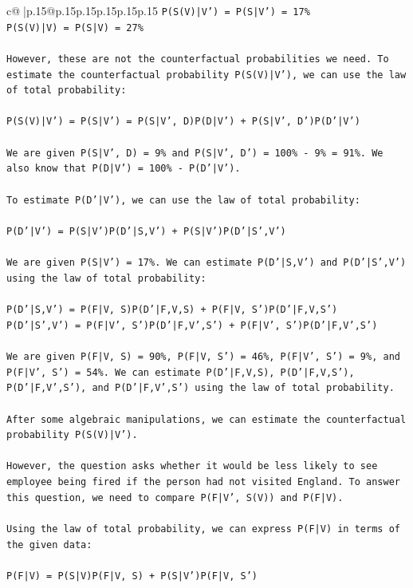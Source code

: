 \documentclass{article}
\begin{document}
{\begin{supertabular}{c@{$\;$}|p{.15\linewidth}@{}p{.15\linewidth}p{.15\linewidth}p{.15\linewidth}p{.15\linewidth}p{.15\linewidth}}
{{{\texttt{P(S(V)|V') = P(S|V') = 17\%} \\
\texttt{P(S(V)|V) = P(S|V) = 27\%} \\
\\ 
\texttt{However, these are not the counterfactual probabilities we need. To estimate the counterfactual probability P(S(V)|V'), we can use the law of total probability:} \\
\\ 
\texttt{P(S(V)|V') = P(S|V') = P(S|V', D)P(D|V') + P(S|V', D')P(D'|V')} \\
\\ 
\texttt{We are given P(S|V', D) = 9\% and P(S|V', D') = 100\% {-} 9\% = 91\%. We also know that P(D|V') = 100\% {-} P(D'|V').} \\
\\ 
\texttt{To estimate P(D'|V'), we can use the law of total probability:} \\
\\ 
\texttt{P(D'|V') = P(S|V')P(D'|S,V') + P(S|V')P(D'|S',V')} \\
\\ 
\texttt{We are given P(S|V') = 17\%. We can estimate P(D'|S,V') and P(D'|S',V') using the law of total probability:} \\
\\ 
\texttt{P(D'|S,V') = P(F|V, S)P(D'|F,V,S) + P(F|V, S')P(D'|F,V,S')} \\
\texttt{P(D'|S',V') = P(F|V', S')P(D'|F,V',S') + P(F|V', S')P(D'|F,V',S')} \\
\\ 
\texttt{We are given P(F|V, S) = 90\%, P(F|V, S') = 46\%, P(F|V', S') = 9\%, and P(F|V', S') = 54\%. We can estimate P(D'|F,V,S), P(D'|F,V,S'), P(D'|F,V',S'), and P(D'|F,V',S') using the law of total probability.} \\
\\ 
\texttt{After some algebraic manipulations, we can estimate the counterfactual probability P(S(V)|V').} \\
\\ 
\texttt{However, the question asks whether it would be less likely to see employee being fired if the person had not visited England. To answer this question, we need to compare P(F|V', S(V)) and P(F|V).} \\
\\ 
\texttt{Using the law of total probability, we can express P(F|V) in terms of the given data:} \\
\\ 
\texttt{P(F|V) = P(S|V)P(F|V, S) + P(S|V')P(F|V, S')} \\
}}}
\end{supertabular}}
\end{document}
